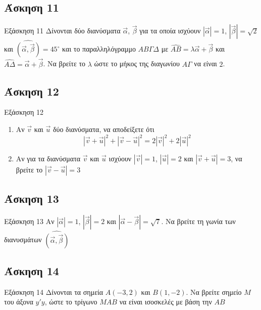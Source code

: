 \documentclass[greek]{beamer}
\begin{document}
\subsection{Άσκηση 11}
\begin{frame}[label=Άσκηση11,t]{Εξάσκηση 11}
      Δίνονται δύο διανύσματα $\vec{α}$, $\vec{β}$ για τα οποία ισχύουν $|\vec{α}|=1$, $|\vec{β}|=\sqrt{2}$ και $\widehat{(\vec{α }, \vec{β })}=45^{\circ}$ και το παραλληλόγραμμο $ΑΒΓΔ$ με $\widehat{ΑΒ}=λ\vec{α}+\vec{β}$ και $\widehat{ΑΔ}=\vec{α}+\vec{β}$. Να βρείτε το $λ$ ώστε το μήκος της διαγωνίου $ΑΓ$ να είναι $2$.
\end{frame}

\subsection{Άσκηση 12}
\begin{frame}[label=Άσκηση12,t]{Εξάσκηση 12}
      \begin{enumerate}
            \item<1-> Αν $\vec{v}$ και $\vec{u}$ δύο διανύσματα, να αποδείξετε ότι
                  $$|\vec{v}+\vec{u}|^2+|\vec{v}-\vec{u}|^2=2|\vec{v}|^2+2|\vec{u}|^2$$
            \item<2-> Αν για τα διανύσματα $\vec{v}$ και $\vec{u}$ ισχύουν $|\vec{v}|=1$, $|\vec{u}|=2$ και $|\vec{v}+\vec{u}|=3$, να βρείτε το $|\vec{v}-\vec{u}|=3$
      \end{enumerate}
\end{frame}

\subsection{Άσκηση 13}
\begin{frame}[label=Άσκηση13,t]{Εξάσκηση 13}
      Αν $|\vec{α}|=1$, $|\vec{β}|=2$ και $|\vec{α}-\vec{β}|=\sqrt{7}$. Να βρείτε τη γωνία των διανυσμάτων $\widehat{(\vec{α }, \vec{β })}$
\end{frame}

\subsection{Άσκηση 14}
\begin{frame}[label=Άσκηση14,t]{Εξάσκηση 14}
      Δίνονται τα σημεία $Α(-3,2)$ και $Β(1,-2)$. Να βρείτε σημείο $Μ$ του άξονα $y'y$, ώστε το τρίγωνο $ΜΑΒ$ να είναι ισοσκελές με βάση την $ΑΒ$
\end{frame}
\end{document}
